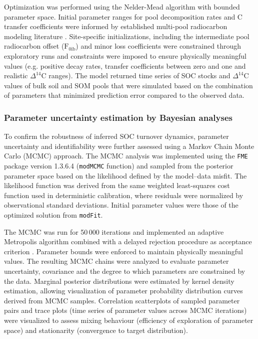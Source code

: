 \documentclass[bg, manuscript]{copernicus}
\begin{document}
Optimization was performed using the Nelder-Mead algorithm with bounded parameter space. Initial parameter ranges for pool decomposition rates and C transfer coefficients were informed by established multi-pool radiocarbon modeling literature \citep{Gaudinski2000, Manzoni2009, Jenkinson1990, Parton1987}. Site-specific initializations, including the intermediate pool radiocarbon offset ($\text{F}_{0\text{ib}}$) and minor loss coefficients were constrained through exploratory runs and constraints were imposed to ensure physically meaningful values (e.g. positive decay rates, transfer coefficients between zero and one and realistic $\Delta^{14}\text{C}$ ranges). The model returned time series of SOC stocks and $\Delta^{14}\text{C}$ values of bulk soil and SOM pools that were simulated based on the combination of parameters that minimized prediction error compared to the observed data.

\subsubsection{Parameter uncertainty estimation by Bayesian analyses}
To confirm the robustness of inferred SOC turnover dynamics, parameter uncertainty and identifiability were further assessed using a Markov Chain Monte Carlo (MCMC) approach. The MCMC analysis was implemented using the \texttt{FME} package version 1.3.6.4 (\texttt{modMCMC} function) and sampled from the posterior parameter space based on the likelihood defined by the model--data misfit. The likelihood function was derived from the same weighted least-squares cost function used in deterministic calibration, where residuals were normalized by observational standard deviations. Initial parameter values were those of the optimized solution from \texttt{modFit}.

The MCMC was run for 50\,000 iterations and implemented an adaptive Metropolis algorithm combined with a delayed rejection procedure as acceptance criterion \citep{Laine2008}. Parameter bounds were enforced to maintain physically meaningful values. The resulting MCMC chains were analyzed to evaluate parameter uncertainty, covariance and the degree to which parameters are constrained by the data. Marginal posterior distributions were estimated by kernel density estimation, allowing visualization of parameter probability distribution curves derived from MCMC samples. Correlation scatterplots of sampled parameter pairs and trace plots (time series of parameter values across MCMC iterations) were visualized to assess mixing behaviour (efficiency of exploration of parameter space) and stationarity (convergence to target distribution).
\end{document}
